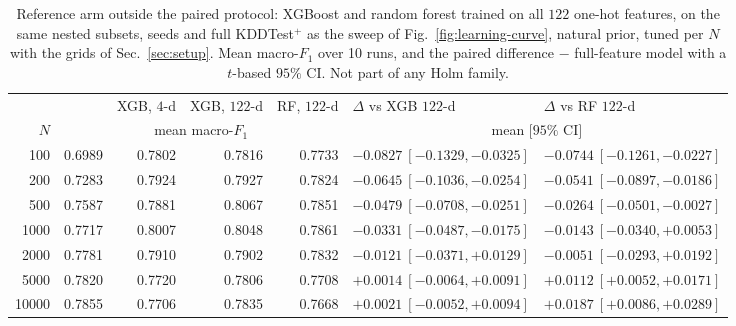 \begin{table}[t]
\centering
\caption{Reference arm outside the paired protocol: XGBoost and random forest trained on all $122$
 one-hot features, on the same nested subsets, seeds and full KDDTest$^+$ as the sweep of
 Fig.~\ref{fig:learning-curve}, natural prior, tuned per $N$ with the grids of Sec.~\ref{sec:setup}.
 Mean macro-$F_1$ over 10 runs, and the paired difference \QSVM{} $-$ full-feature model with a
 $t$-based $95\%$ CI. Not part of any Holm family.}
\label{tab:ref-arm}
\footnotesize
\setlength{\tabcolsep}{3pt}
\begin{tabular}{@{}r rr rr l l@{}}
\toprule
 & \QSVM{} & XGB, $4$-d & XGB, $122$-d & RF, $122$-d & $\Delta$ vs XGB $122$-d & $\Delta$ vs RF $122$-d \\
$N$ & \multicolumn{4}{c}{mean macro-$F_1$} & \multicolumn{2}{c}{mean $[95\%$ CI$]$} \\
\midrule
100 & 0.6989 & 0.7802 & 0.7816 & 0.7733 & $-0.0827\ [-0.1329,-0.0325]$ & $-0.0744\ [-0.1261,-0.0227]$ \\
200 & 0.7283 & 0.7924 & 0.7927 & 0.7824 & $-0.0645\ [-0.1036,-0.0254]$ & $-0.0541\ [-0.0897,-0.0186]$ \\
500 & 0.7587 & 0.7881 & 0.8067 & 0.7851 & $-0.0479\ [-0.0708,-0.0251]$ & $-0.0264\ [-0.0501,-0.0027]$ \\
1000 & 0.7717 & 0.8007 & 0.8048 & 0.7861 & $-0.0331\ [-0.0487,-0.0175]$ & $-0.0143\ [-0.0340,+0.0053]$ \\
2000 & 0.7781 & 0.7910 & 0.7902 & 0.7832 & $-0.0121\ [-0.0371,+0.0129]$ & $-0.0051\ [-0.0293,+0.0192]$ \\
5000 & 0.7820 & 0.7720 & 0.7806 & 0.7708 & $+0.0014\ [-0.0064,+0.0091]$ & $+0.0112\ [+0.0052,+0.0171]$ \\
10000 & 0.7855 & 0.7706 & 0.7835 & 0.7668 & $+0.0021\ [-0.0052,+0.0094]$ & $+0.0187\ [+0.0086,+0.0289]$ \\
\bottomrule
\end{tabular}
\end{table}
